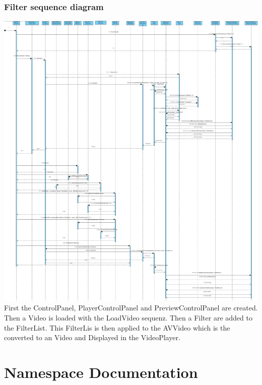 \documentclass[twoside]{book}
\newcommand{\+}{\discretionary{\mbox{\scriptsize$\hookleftarrow$}}{}{}}
\begin{document}
\subsection*{Filter sequence diagram}
{\centering\includegraphics[width=1\textwidth]{SequenceDiagram3.jpg}}\\
First the ControlPanel, PlayerControlPanel and PreviewControlPanel are created.
Then a Video is loaded with the LoadVideo sequenz. Then a Filter are added to the FilterList. This FilterLis is then applied to the AVVideo which is the converted to an Video and Displayed in the VideoPlayer.
\chapter{Namespace Documentation}





\end{document}
